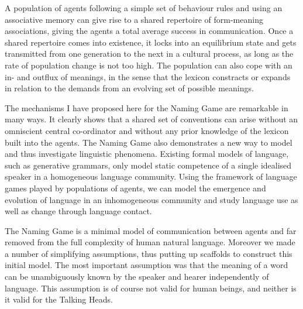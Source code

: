 A population of agents following a simple set of 
behaviour rules and using an associative memory
can give rise to a shared repertoire of form-meaning 
associations, giving the agents a total average success in 
communication. Once a shared repertoire comes
into existence, it locks into an equilibrium state and 
gets transmitted from one generation to the next in a 
cultural process, as long as the rate of population change 
is not too high. The population can also cope with 
an in- and outflux of meanings, in the sense that 
the lexicon constracts or expands in relation to the 
demands from an evolving set of possible meanings.  

The mechanisms I have proposed here for the Naming Game are
remarkable in many ways. It clearly shows that a
shared set of conventions
can arise without an omniscient central co-ordinator and
without any prior knowledge of the lexicon built into 
the agents. The Naming Game also demonstrates
a new way to model and thus
investigate linguistic phenomena. Existing formal models
of language, such as generative grammars, only model static
competence of a single idealised speaker in a homogeneous language
community. Using the framework of language games 
played by populations of agents, we can model the 
emergence and evolution of language in an inhomogeneous community
and study language use as well as change 
through language contact. 

\newpage
The Naming Game is a minimal model of communication 
between agents and far removed from the full complexity 
of human natural language. Moreover we made a number of 
simplifying assumptions, thus putting up scaffolds to
construct this initial model. The most important assumption
was that the meaning of a word can be unambiguously 
known by the speaker and hearer independently of language. 
This assumption is of course not valid for human 
beings, and neither is it valid for the Talking Heads. 



